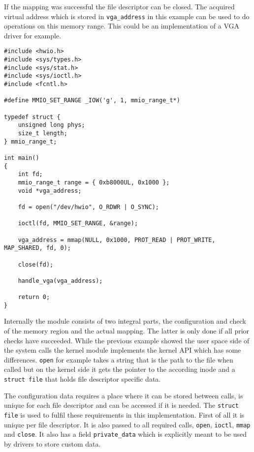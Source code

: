 \documentclass[
a4paper,
12pt,
notitlepage,
parskip=half,
DIV=11,
]{scrbook}
\begin{document}
		If the mapping was successful the file descriptor can be closed.
		The acquired virtual address which is stored in \texttt{vga\_address} in this example can be used to do operations on this memory range.
		This could be an implementation of a VGA driver for example.
		
		\begin{lstlisting}
#include <hwio.h>
#include <sys/types.h>
#include <sys/stat.h>
#include <sys/ioctl.h>
#include <fcntl.h>

#define MMIO_SET_RANGE _IOW('g', 1, mmio_range_t*)

typedef struct {
	unsigned long phys;
	size_t length;
} mmio_range_t;

int main()
{
	int fd;
	mmio_range_t range = { 0xb8000UL, 0x1000 };
	void *vga_address;
	
	fd = open("/dev/hwio", O_RDWR | O_SYNC);
	
	ioctl(fd, MMIO_SET_RANGE, &range);
	
	vga_address = mmap(NULL, 0x1000, PROT_READ | PROT_WRITE, MAP_SHARED, fd, 0);
	
	close(fd);
	
	handle_vga(vga_address);
	
	return 0;
}
		\end{lstlisting}
		
		Internally the module consists of two integral parts, the configuration and check of the memory region and the actual mapping.
		The latter is only done if all prior checks have succeeded.
		While the previous example showed the user space side of the system calls the kernel module implements the kernel API which has some differences.
		\texttt{open} for example takes a string that is the path to the file when called but on the kernel side it gets the pointer to the according inode and a \texttt{struct file} that holds file descriptor specific data.
		
		The configuration data requires a place where it can be stored between calls, is unique for each file descriptor and can be accessed if it is needed.
		The \texttt{struct file} is used to fulfil these requirements in this implementation.
		First of all it is unique per file descriptor.
		It is also passed to all required calls, \texttt{open}, \texttt{ioctl}, \texttt{mmap} and \texttt{close}.
		It also has a field \texttt{private\_data} which is explicitly meant to be used by drivers to store custom data.
		
\end{document}
